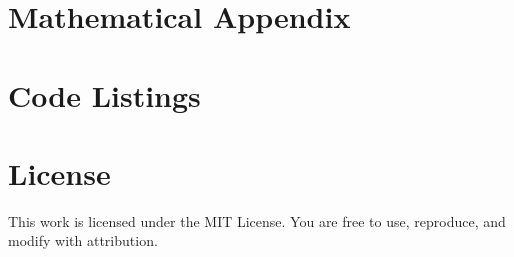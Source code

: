 \documentclass[12pt]{article}
\begin{document}
\appendix
\section{Mathematical Appendix}


\section{Code Listings}


\section*{License}
This work is licensed under the MIT License. You are free to use, reproduce, and modify with attribution.



\end{document}
